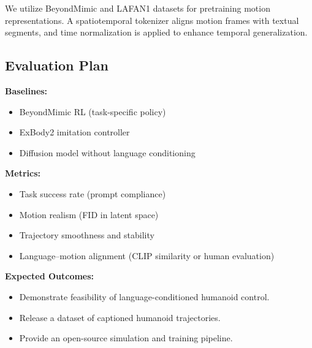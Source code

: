 We utilize BeyondMimic and LAFAN1 datasets for pretraining motion representations. 
A spatiotemporal tokenizer aligns motion frames with textual segments, and time normalization is applied to enhance temporal generalization.

\subsection{Evaluation Plan}

\textbf{Baselines:}
\begin{itemize}
    \item BeyondMimic RL (task-specific policy)
    \item ExBody2 imitation controller
    \item Diffusion model without language conditioning
\end{itemize}

\textbf{Metrics:}
\begin{itemize}
    \item Task success rate (prompt compliance)
    \item Motion realism (FID in latent space)
    \item Trajectory smoothness and stability
    \item Language–motion alignment (CLIP similarity or human evaluation)
\end{itemize}

\textbf{Expected Outcomes:}
\begin{itemize}
    \item Demonstrate feasibility of language-conditioned humanoid control.
    \item Release a dataset of captioned humanoid trajectories.
    \item Provide an open-source simulation and training pipeline.
\end{itemize}